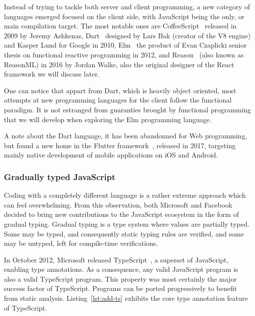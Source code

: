 Instead of trying to tackle both server and client programming,
a new category of languages emerged focused on the client side,
with JavaScript being the only, or main compilation target.
The most notable ones are CoffeeScript~\cite{coffeescript} released in 2009
by Jeremy Ashkenas, Dart~\cite{dart-blog} designed by Lars Bak
(creator of the V8 engine) and Kasper Lund for Google in 2010,
Elm~\cite{czaplicki2013asynchronous} the product of Evan Czaplicki senior thesis
on functional reactive programming in 2012,
and Reason~\cite{reason} (also known as ReasonML) in 2016 by Jordan Walke,
also the original designer of the React framework we will discuss later.

One can notice that appart from Dart, which is heavily object oriented,
most attempts at new programming languages for the client follow the functional paradigm.
It is not estranged from guaranties brought by
functional programming that we will develop when exploring the Elm programming language.

A note about the Dart language, it has been abandonned for Web programming,
but found a new home in the Flutter framework~\cite{flutter}, released in 2017,
targeting mainly native development of mobile applications on iOS and Android.

\subsubsection{Gradually typed JavaScript}%
\label{ssub:gradually_typed_javascript}

Coding with a completely different language is a rather extreme approach
which can feel overwhelming.
From this observation, both Microsoft and Facebook decided to bring
new contributions to the JavaScript ecosystem in the form of gradual typing.
Gradual typing is a type system where values are partially typed.
Some may be typed, and consequently static typing rules are verified,
and some may be untyped, left for compile-time verifications.

In October 2012, Microsoft released TypeScript~\cite{bierman2014understanding},
a superset of JavaScript, enabling type annotations.
As a consequence, any valid JavaScript program is also a valid TypeScript program.
This property was most certainly the major success factor of TypeScript.
Programs can be ported progressively to benefit from static analysis.
Listing~\ref{lst:add-ts} exhibits the core type annotation feature of TypeScript.



